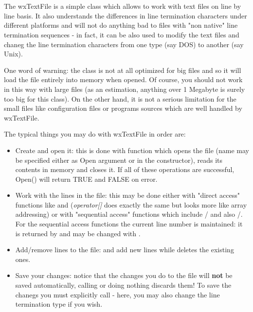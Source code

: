 \section{}\label{wxtextfile}

The wxTextFile is a simple class which allows to work with text files on line by
line basis. It also understands the differences in line termination characters
under different platforms and will not do anything bad to files with "non
native" line termination sequences - in fact, it can be also used to modify the
text files and chaneg the line termination characters from one type (say DOS) to
another (say Unix).

One word of warning: the class is not at all optimized for big files and so it
will load the file entirely into memory when opened. Of course, you should not
work in this way with large files (as an estimation, anything over 1 Megabyte is
surely too big for this class). On the other hand, it is not a serious
limitation for the small files like configuration files or programs sources
which are well handled by wxTextFile.

The typical things you may do with wxTextFile in order are:

\begin{itemize}\itemsep=0pt
\item Create and open it: this is done with  
function which opens the file (name may be specified either as Open argument or
in the constructor), reads its contents in memory and closes it. If all of these
operations are successful, Open() will return TRUE and FALSE on error.
\item Work with the lines in the file: this may be done either with "direct
access" functions like  and
 ({\it operator[]} does exactly the same
but looks more like array addressing) or with "sequential access" functions
which include /
 and also 
/.
For the sequential access functions the current line number is maintained: it is
returned by  and may be
changed with .
\item Add/remove lines to the file:  and 
 add new lines while 
 deletes the existing ones.
\item Save your changes: notice that the changes you do to the file will {\bf
not} be saved automatically, calling  or doing
nothing discards them! To save the chanegs you must explicitly call 
 - here, you may also change the line
termination type if you wish.
\end{itemize}

